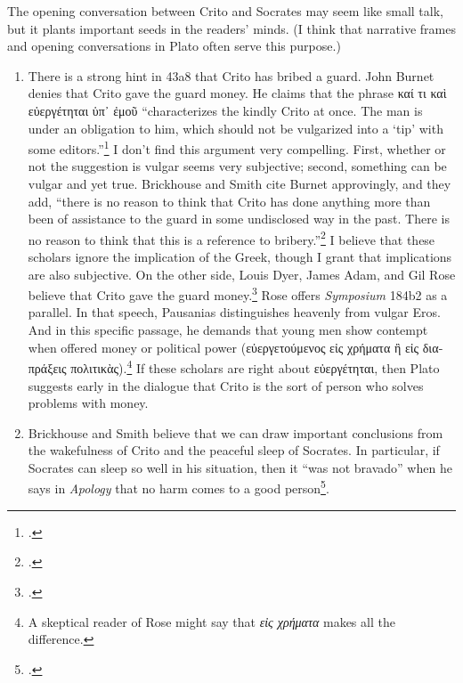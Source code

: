 \documentclass[12pt,letterpaper]{article}
\begin{document}
The opening conversation between Crito and Socrates may seem like small talk, but it plants important seeds in the readers' minds. (I think that narrative frames and opening conversations in Plato often serve this purpose.)

\begin{enumerate}

    \item There is a strong hint in 43a8 that Crito has bribed a guard. John Burnet denies that Crito gave the guard money. He claims that the phrase \textgreek{καί τι καὶ εὐεργέτηται ὑπ᾽ ἐμοῦ} ``characterizes the kindly Crito at once. The man is under an obligation to him, which should not be vulgarized into a `tip' with some editors.''\footcite[][on 43a8]{burnet1924-euthyphro-apology-crito} I don't find this argument very compelling. First, whether or not the suggestion is vulgar seems very subjective; second, something can be vulgar and yet true. Brickhouse and Smith cite Burnet approvingly, and they add, ``there is no reason to think that Crito has done anything more than been of assistance to the guard in some undisclosed way in the past. There is no reason to think that this is a reference to bribery.''\footcite[][249]{brickhouse-smith2004-plato-trial-of-socrates}  I believe that these scholars ignore the implication of the Greek, though I grant that implications are also subjective. On the other side, Louis Dyer, James Adam, and Gil Rose believe that Crito gave the guard money.\footcites[][on 43a9]{dyer-apology-crito-2007}[][on 43a9]{adam1988-crito}[][on 43a8]{rose1983} Rose offers \textit{Symposium} 184b2 as a parallel. In that speech, Pausanias distinguishes heavenly from vulgar Eros. And in this specific passage, he demands that young men show contempt when offered money or political power (\textgreek{εὐεργετούμενος εἰς χρήματα ἢ εἰς διαπράξεις πολιτικὰς}).\footnote{A skeptical reader of Rose might say that \textit{εἰς χρήματα} makes all the difference.} If these scholars are right about \textgreek{εὐεργέτηται}, then Plato suggests early in the dialogue that Crito is the sort of person who solves problems with money.

    \item Brickhouse and Smith believe that we can draw important conclusions from the wakefulness of Crito and the peaceful sleep of Socrates. In particular, if Socrates can sleep so well in his situation, then it ``was not bravado'' when he says in \textit{Apology} that no harm comes to a good person\footcite[][197]{brickhouse-smith2004-plato-trial-of-socrates}.


\end{enumerate}
\end{document}
